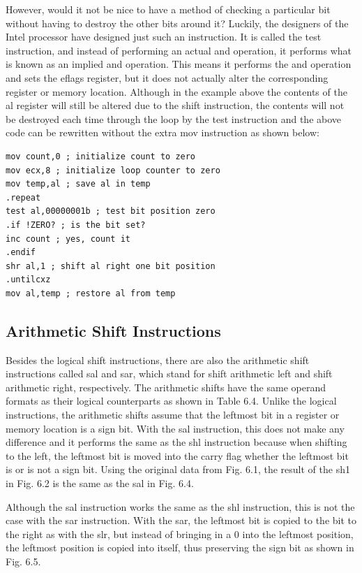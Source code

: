 \documentclass[10pt]{book}
\begin{document}
However, would it not be nice to have a method of checking a particular bit without having to destroy the other bits around it? Luckily, the designers of the Intel processor have designed just such an instruction. It is called the test instruction, and instead of performing an actual and operation, it performs what is known as an implied and operation. This means it performs the and operation and sets the eflags register, but it does not actually alter the corresponding register or memory location. Although in the example above the contents of the al register will still be altered due to the shift instruction, the contents will not be destroyed each time through the loop by the test instruction and the above code can be rewritten without the extra mov instruction as shown below:

\begin{verbatim}
mov count,0 ; initialize count to zero
mov ecx,8 ; initialize loop counter to zero
mov temp,al ; save al in temp
.repeat
test al,00000001b ; test bit position zero
.if !ZERO? ; is the bit set?
inc count ; yes, count it
.endif
shr al,1 ; shift al right one bit position
.untilcxz
mov al,temp ; restore al from temp
\end{verbatim}

\subsection{Arithmetic Shift Instructions}
Besides the logical shift instructions, there are also the arithmetic shift instructions called sal and sar, which stand for shift arithmetic left and shift arithmetic right, respectively. The arithmetic shifts have the same operand formats as their logical counterparts as shown in Table 6.4.
Unlike the logical instructions, the arithmetic shifts assume that the leftmost bit in a register or memory location is a sign bit. With the sal instruction, this does not make any difference and it performs the same as the shl instruction because when shifting to the left, the leftmost bit is moved into the carry flag whether the leftmost bit is or is not a sign bit. Using the original data from Fig. 6.1, the result of the sh1 in Fig. 6.2 is the same as the sal in Fig. 6.4.

Although the sal instruction works the same as the shl instruction, this is not the case with the sar instruction. With the sar, the leftmost bit is copied to the bit to the right as with the slr, but instead of bringing in a 0 into the leftmost position, the leftmost position is copied into itself, thus preserving the sign bit as shown in Fig. 6.5.
\end{document}
